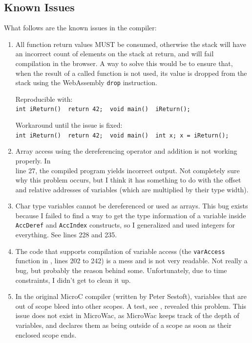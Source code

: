 \documentclass[a4paper]{article}
\begin{document}
\subsection{Known Issues}
\label{sec:testing:known-issues}
What follows are the known issues in the compiler:
\begin{enumerate}
	\item All function return values MUST be consumed, otherwise the stack will have an incorrect count of elements on the stack at return, and will fail compilation in the browser. A way to solve this would be to ensure that, when the result of a called function is not used, its value is dropped from the stack using the WebAssembly \texttt{drop} instruction.

	Reproducible with:\\
	\texttt{int iReturn() { return 42; } void main() { iReturn(); }}
	
	Workaround until the issue is fixed:\\
	\texttt{int iReturn() { return 42; } void main() { int x; x = iReturn(); }}

	\item Array access using the dereferencing operator and addition is not working properly. In\\ line 27, the compiled program yields incorrect output. Not completely sure why this problem occurs, but I think it has something to do with the offset and relative addresses of variables (which are multiplied by their type width).

	\item Char type variables cannot be dereferenced or used as arrays. This bug exists because I failed to find a way to get the type information of a variable inside \texttt{AccDeref} and \texttt{AccIndex} constructs, so I generalized and used integers for everything. See  lines 228 and 235.

	\item The code that supports compilation of variable access (the \texttt{varAccess} function in , lines 202 to 242) is a mess and is not very readable. Not really a bug, but probably the reason behind some.  Unfortunately, due to time constraints, I didn't get to clean it up.

	\item In the original MicroC compiler (written by Peter Sestoft), variables that are out of scope bleed into other scopes. A test, see , revealed this problem. This issue does not exist in MicroWac, as MicroWac keeps track of the depth of variables, and declares them as being outside of a scope as soon as their enclosed scope ends.
\end{enumerate}
\end{document}

